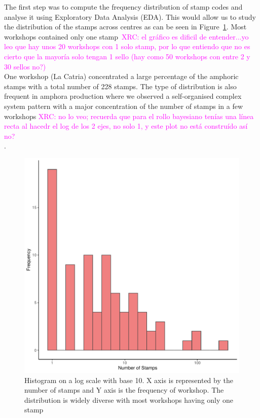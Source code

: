 \documentclass[review]{elsarticle}
\newcommand{\memo}[2]{\textcolor{#1}{#2}}
\newcommand{\xavi}[1]{\memo{magenta}{XRC: #1\\}}
\begin{document}
The first step was to compute the frequency distribution of stamp codes and analyse it using Exploratory Data Analysis (EDA). This would allow us to study the distribution of the stamps across centres as can be seen in Figure~\ref{stamps}. Most workshops contained only one stamp~\xavi{el gráfico es dificil de entender...yo leo que hay unos 20 workshops con 1 solo stamp, por lo que entiendo que no es cierto que la mayoría solo tengan 1 sello (hay como 50 workshops con entre 2 y 30 sellos no?)} One workshop (La Catria) concentrated a large percentage of the amphoric stamps with a total number of 228 stamps. The type of distribution is also frequent in amphora production where we observed a self-organised complex system pattern with a major concentration of the number of stamps in a few workshops \citep{bayesian_2018,coto-sarmiento_identifying_2018}\xavi{no lo veo; recuerda que para el rollo bayesiano tenías una línea recta al hacedr el log de los 2 ejes, no solo 1, y este plot no está construído así no?}.



\begin{figure}[htp]
	\centering
\includegraphics[width=\linewidth]{figs/frequencystamp.pdf}
\caption{Histogram on a log scale with base 10. X axis is represented by the number of stamps and Y axis is the frequency of workshop. The distribution is widely diverse with most workshops having only one stamp}
\label{stamps}
\end{figure} 
\end{document}
